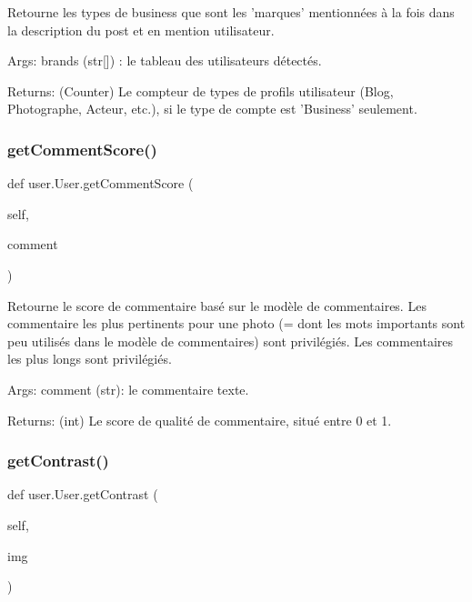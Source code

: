 \begin{DoxyVerb}Retourne les types de business que sont les 'marques' mentionnées à la fois dans la description du post et en mention utilisateur.

Args:
    brands (str[]) : le tableau des utilisateurs détectés.

Returns:
    (Counter) Le compteur de types de profils utilisateur (Blog, Photographe, Acteur, etc.), si le type de compte est 'Business' seulement.
\end{DoxyVerb}
 \mbox{\label{classuser_1_1_user_ae21bbe88ed8f0421aba11b51df3fc03f}} 
\subsubsection{\texorpdfstring{get\+Comment\+Score()}{getCommentScore()}}
{\footnotesize\ttfamily def user.\+User.\+get\+Comment\+Score (\begin{DoxyParamCaption}\item[{}]{self,  }\item[{}]{comment }\end{DoxyParamCaption})}

\begin{DoxyVerb}Retourne le score de commentaire basé sur le modèle de commentaires.
Les commentaire les plus pertinents pour une photo (= dont les mots importants sont peu utilisés dans le modèle de commentaires) sont privilégiés.
Les commentaires les plus longs sont privilégiés.

Args:
    comment (str): le commentaire texte.

Returns:
    (int) Le score de qualité de commentaire, situé entre 0 et 1.
\end{DoxyVerb}
 \mbox{\label{classuser_1_1_user_ab013b6d1535fe2b752a8eb5649018a1c}} 
\subsubsection{\texorpdfstring{get\+Contrast()}{getContrast()}}
{\footnotesize\ttfamily def user.\+User.\+get\+Contrast (\begin{DoxyParamCaption}\item[{}]{self,  }\item[{}]{img }\end{DoxyParamCaption})}

